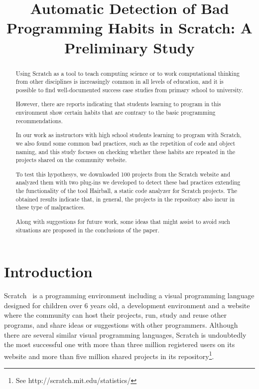 \documentclass[conference]{format/IEEEtran}
\title{Automatic Detection of Bad Programming Habits in Scratch: A Preliminary Study}
\author{\IEEEauthorblockN{Jesús Moreno}
\IEEEauthorblockA{INTEF \& Programamos.es\\
Madrid, Spain\\
jesus.moreno@programamos.es}
\and
\IEEEauthorblockN{Gregorio Robles}
\IEEEauthorblockA{GSyC/LibreSoft\\Universidad Rey Juan Carlos\\
Madrid, Spain\\
grex@gsyc.urjc.es}}
\begin{document}
\maketitle

\begin{abstract}
Using Scratch as a tool to teach computing science or to work computational thinking from other disciplines is increasingly common in all levels of education, and it is possible to find well-documented success case studies from primary school to university.

However, there are reports indicating that students learning to program in this environment show certain habits that are contrary to the basic programming recommendations. 

In our work as instructors with high school students learning to program with Scratch, we also found some common bad practices, such as the repetition of code and object naming, and this study focuses on checking whether these habits are repeated in the projects shared on the community website. 

To test this hypothesys, we downloaded 100 projects from the Scratch website and analyzed them with two plug-ins we developed to detect these bad practices extending the functionality of the tool Hairball, a static code analyzer for Scratch projects. The obtained results indicate that, in general, the projects in the repository also incur in these type of malpractices. 

Along with suggestions for future work, some ideas that might assist to avoid such situations are proposed in the conclusions of the paper.

\end{abstract}

\section{Introduction}

Scratch~\cite{resnick2009scratch}  is a programming environment including a visual programming language designed for children over 6 years old, a development environment and a website where the community can host their projects, run, study and reuse other programs, and share ideas or suggestions with other programmers. Although there are several similar visual programming languages, Scratch is undoubtedly the most successful one with more than three million registered users on its website and more than five million shared projects in its repository\footnote{See http://scratch.mit.edu/statistics/}.
\end{document}
